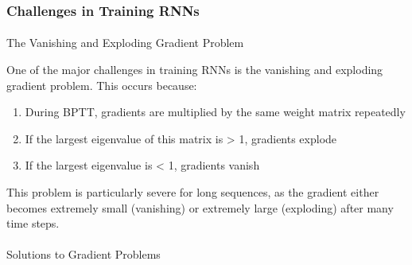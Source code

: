 \documentclass[
  letterpaper,
  DIV=11,
  numbers=noendperiod]{scrreprt}
\makeatletter
\let\oldparagraph\paragraph
\renewcommand{\paragraph}{
    \@ifstar
      \xxxParagraphStar
      \xxxParagraphNoStar
  }
\newcommand{\xxxParagraphStar}[1]{\oldparagraph*{#1}\mbox{}}
\newcommand{\xxxParagraphNoStar}[1]{\oldparagraph{#1}\mbox{}}
\providecommand{\tightlist}{%
  \setlength{\itemsep}{0pt}\setlength{\parskip}{0pt}}\usepackage{longtable,booktabs,array}
\makeatother
\begin{document}
\subsubsection{Challenges in Training
RNNs}\label{challenges-in-training-rnns}

\paragraph{The Vanishing and Exploding Gradient
Problem}\label{the-vanishing-and-exploding-gradient-problem}

One of the major challenges in training RNNs is the vanishing and
exploding gradient problem. This occurs because:

\begin{enumerate}
\def\labelenumi{\arabic{enumi}.}
\tightlist
\item
  During BPTT, gradients are multiplied by the same weight matrix
  repeatedly
\item
  If the largest eigenvalue of this matrix is \textgreater{} 1,
  gradients explode
\item
  If the largest eigenvalue is \textless{} 1, gradients vanish
\end{enumerate}

This problem is particularly severe for long sequences, as the gradient
either becomes extremely small (vanishing) or extremely large
(exploding) after many time steps.

\paragraph{Solutions to Gradient
Problems}\label{solutions-to-gradient-problems}
\end{document}
